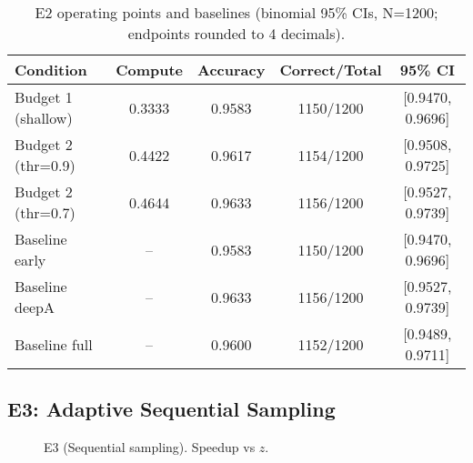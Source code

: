 \begin{table}[H]
  \centering
  \caption{E2 operating points and baselines (binomial 95\% CIs, N=1200; endpoints rounded to 4 decimals).}
  \vspace{0.25em}
  \begin{adjustbox}{width=\linewidth}
  \begin{tabular}{l c c c c}
    \toprule
    Condition & Compute & Accuracy & Correct/Total & 95\% CI \\
    \midrule
    Budget 1 (shallow) & 0.3333 & 0.9583 & 1150/1200 & [0.9470, 0.9696] \\
    Budget 2 (thr=0.9) & 0.4422 & 0.9617 & 1154/1200 & [0.9508, 0.9725] \\
    Budget 2 (thr=0.7) & 0.4644 & 0.9633 & 1156/1200 & [0.9527, 0.9739] \\
    \midrule
    Baseline early & -- & 0.9583 & 1150/1200 & [0.9470, 0.9696] \\
    Baseline deepA & -- & 0.9633 & 1156/1200 & [0.9527, 0.9739] \\
    Baseline full  & -- & 0.9600 & 1152/1200 & [0.9489, 0.9711] \\
    \bottomrule
  \end{tabular}
  \end{adjustbox}
\end{table}

\subsection{E3: Adaptive Sequential Sampling}
\begin{figure}[H]
  \centering
  \begin{adjustbox}{width=\linewidth}
  \end{adjustbox}
  \caption{E3 (Sequential sampling). Speedup vs $z$.}
  \label{fig:e3}
\end{figure}

